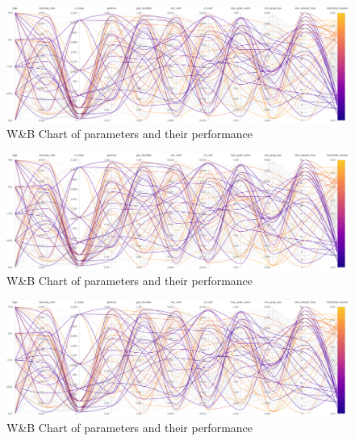 \documentclass[../xlapes02]{subfiles}
\begin{document}
    \newpage
    \begin{figure}[h!]
        \centering
        \includegraphics[width=\linewidth, height=0.2\paperheight]{image/figure/wb1}
        \caption{W\&B Chart of parameters and their performance}
        \label{fig:wb-chart1}
    \end{figure}
    \begin{figure}[h!]
        \centering
        \includegraphics[width=\linewidth, height=0.2\paperheight]{image/figure/wb1}
        \caption{W\&B Chart of parameters and their performance}
        \label{fig:wb-chart2}
    \end{figure}
    \begin{figure}[h!]
        \centering
        \includegraphics[width=\linewidth, height=0.2\paperheight]{image/figure/wb1}
        \caption{W\&B Chart of parameters and their performance}
        \label{fig:wb-chart3}
    \end{figure}
\end{document}

